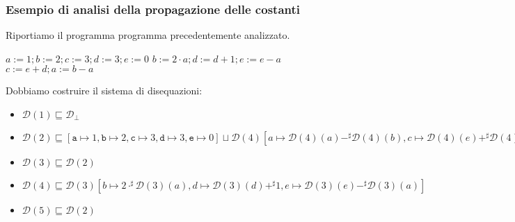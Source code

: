 \subsubsection{Esempio di analisi della propagazione delle costanti}

\begin{minipage}{0.5\textwidth}
    Riportiamo il programma programma precedentemente analizzato.

    \begin{algorithm}[H]
        $a:=1; b:=2; c:=3; d:=3; e:=0$\;
        {
            $b := 2 \cdot a; d:=d+1; e:=e-a$\;
            $c :=e + d; a:= b - a$\;
        }
    \end{algorithm}
\end{minipage}
\begin{minipage}{0.5\textwidth}
    \begin{figure}[H]
        \centering
    \end{figure}
\end{minipage}
Dobbiamo costruire il sistema di disequazioni:
\begin{itemize}
    \item $ \mathcal{D}(1) \sqsubseteq \mathcal{D}_\bot$
    \item $ \mathcal{D}(2) \sqsubseteq [\texttt{a} \mapsto 1, \texttt{b} 
    \mapsto 2, \texttt{c} \mapsto 3, \texttt{d} \mapsto 3, \texttt{e} \mapsto 0] 
    \sqcup \mathcal{D}(4)[a \mapsto \mathcal{D}(4)(a) -^{\sharp} \mathcal{D}(4)(b), 
    c \mapsto \mathcal{D}(4)(e) +^{\sharp} \mathcal{D}(4)(d)]$
    \item $ \mathcal{D}(3) \sqsubseteq \mathcal{D}(2)$
    \item $ \mathcal{D}(4) \sqsubseteq \mathcal{D}(3)[b \mapsto 2 \cdot^{\sharp} 
    \mathcal{D}(3)(a), d \mapsto \mathcal{D}(3)(d) +^{\sharp} 1, 
    e \mapsto \mathcal{D}(3)(e) -^{\sharp} \mathcal{D}(3)(a)]$
    \item $ \mathcal{D}(5) \sqsubseteq \mathcal{D}(2)$
\end{itemize} 
